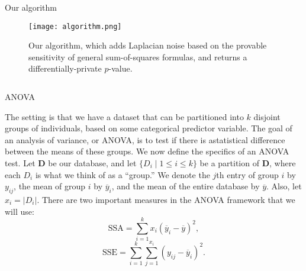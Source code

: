 \documentclass[final]{beamer}
\newlength{\onecolwid}
\newlength{\twocolwid}
\begin{document}
\begin{frame}[t]
\begin{columns}[t]
\begin{column}{\twocolwid}
\begin{columns}[t,totalwidth=\twocolwid]
\begin{column}{\onecolwid}
\begin{block}{Our algorithm}
\begin{figure}
\texttt{[image: algorithm.png]}
\caption{Our algorithm, which adds Laplacian noise based on the provable sensitivity of 
	general sum-of-squares formulas, and returns a differentially-private $p$-value.}
\end{figure}


\end{block}


\end{column} %

\end{columns} %


\begin{columns}[t,totalwidth=\twocolwid] %

\begin{column}{\onecolwid} %


\begin{block}{ANOVA}

The setting is that we have a dataset that can be partitioned into $k$ disjoint groups of 
individuals, based on some categorical predictor variable. The goal of an analysis of variance, or ANOVA, is to test if there is astatistical difference between the means of these groups. 
We now define the specifics of an ANOVA test.
Let $\textbf{D}$ be our database, and let $\{D_i \; |\; 1\leq i\leq k \}$ be a partition of 
$\textbf{D}$, where each $D_i$ is what we think of as a ``group.'' We denote the $j$th entry of group $i$ by $y_{ij}$, the mean of group $i$ by $\overline{y}_i$, and the mean of the entire 
database by $\overline{y}$. Also, let $x_i = |D_i|$. 
There are two important measures in the ANOVA framework that we will use:
\[
\text{SSA} = \sum_{i=1}^{k} x_i(\overline{y}_i - \overline{y})^2,
\]
\[
\text{SSE} = \sum_{i=1}^{k} \sum_{j=1}^{x_i} (y_{ij} - \overline{y}_i)^2.
\]


\end{block}
\end{column}
\end{columns}
\end{column}
\end{columns}
\end{frame}
\end{document}
